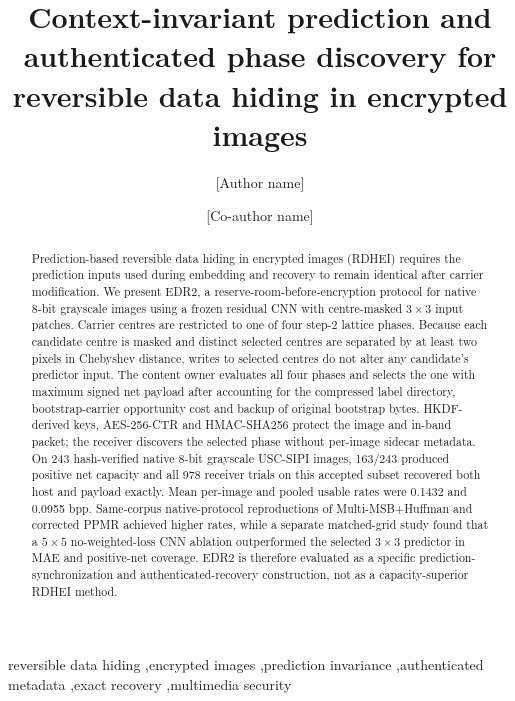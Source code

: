 \documentclass[preprint,12pt,a4paper]{elsarticle}
\begin{document}
\begin{frontmatter}

\title{Context-invariant prediction and authenticated phase discovery for reversible data hiding in encrypted images}

\author[inst1]{[Author name]}
\author[inst1]{[Co-author name]}
\address[inst1]{[Department, institution, city, country]}

\begin{abstract}
Prediction-based reversible data hiding in encrypted images (RDHEI) requires the prediction inputs used during embedding and recovery to remain identical after carrier modification. We present EDR2, a reserve-room-before-encryption protocol for native 8-bit grayscale images using a frozen residual CNN with centre-masked $3\times3$ input patches. Carrier centres are restricted to one of four step-2 lattice phases. Because each candidate centre is masked and distinct selected centres are separated by at least two pixels in Chebyshev distance, writes to selected centres do not alter any candidate's predictor input. The content owner evaluates all four phases and selects the one with maximum signed net payload after accounting for the compressed label directory, bootstrap-carrier opportunity cost and backup of original bootstrap bytes. HKDF-derived keys, AES-256-CTR and HMAC-SHA256 protect the image and in-band packet; the receiver discovers the selected phase without per-image sidecar metadata. On 243 hash-verified native 8-bit grayscale USC-SIPI images, 163/243 produced positive net capacity and all 978 receiver trials on this accepted subset recovered both host and payload exactly. Mean per-image and pooled usable rates were 0.1432 and 0.0955 bpp. Same-corpus native-protocol reproductions of Multi-MSB+Huffman and corrected PPMR achieved higher rates, while a separate matched-grid study found that a $5\times5$ no-weighted-loss CNN ablation outperformed the selected $3\times3$ predictor in MAE and positive-net coverage. EDR2 is therefore evaluated as a specific prediction-synchronization and authenticated-recovery construction, not as a capacity-superior RDHEI method.

\end{abstract}

\begin{keyword}
reversible data hiding \sep encrypted images \sep prediction invariance \sep authenticated metadata \sep exact recovery \sep multimedia security
\end{keyword}

\end{frontmatter}
\end{document}
